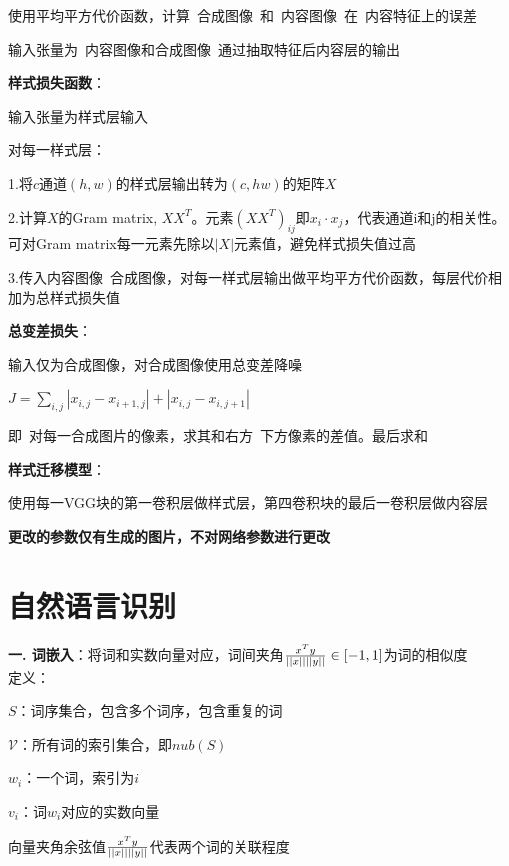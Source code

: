 \documentclass[UTF8]{ctexart}
\begin{document}
  \quad \quad 使用平均平方代价函数，计算\ 合成图像\ 和\ 内容图像\ 在\ 内容特征上的误差

  \quad \quad 输入张量为\ 内容图像和合成图像\ 通过抽取特征后内容层的输出

  \quad \textbf{样式损失函数}：

  \quad \quad 输入张量为样式层输入

  \quad \quad 对每一样式层：

  \quad \quad \quad 1.将$c$通道$(h, w)$的样式层输出转为$(c, hw)$的矩阵$X$

  \quad \quad \quad 2.计算$X$的Gram matrix, $XX^T$。元素$(XX^T)_{ij}$即$x_i \cdot x_j$，代表通道i和j的相关性。可对Gram matrix每一元素先除以$|X|$元素值，避免样式损失值过高

  \quad \quad \quad 3.传入内容图像\ 合成图像，对每一样式层输出做平均平方代价函数，每层代价相加为总样式损失值

  \quad \textbf{总变差损失}：

  \quad \quad 输入仅为合成图像，对合成图像使用总变差降噪

  \quad \quad $J = \sum_{i, j} |x_{i,j} - x_{i+1,j}| + |x_{i,j} - x_{i,j+1}|$

  \quad \quad \quad 即\ 对每一合成图片的像素，求其和右方\ 下方像素的差值。最后求和

  \textbf{样式迁移模型}：

  \quad 使用每一VGG块的第一卷积层做样式层，第四卷积块的最后一卷积层做内容层
  
  \quad \textbf{更改的参数仅有生成的图片，不对网络参数进行更改}

\section{自然语言识别}
\noindent \textbf{一. 词嵌入}：将词和实数向量对应，词间夹角$\frac{x^Ty}{||x||\space||y||} \in [-1, 1]$为词的相似度\\
定义：

  $S$：词序集合，包含多个词序，包含重复的词

  $\mathcal{V} $：所有词的索引集合，即$nub(S)$

  $w_i$：一个词，索引为$i$

  $v_i$：词$w_i$对应的实数向量
  
  \quad 向量夹角余弦值$\frac{x^Ty}{||x||\space ||y||}$代表两个词的关联程度
\end{document}
